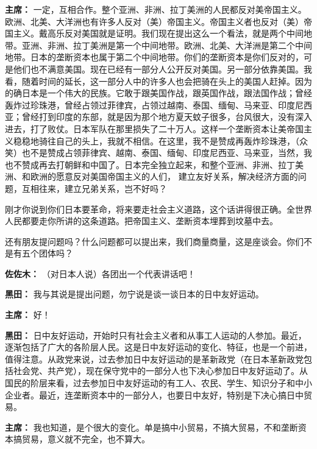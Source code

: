 \begin{list}{}
\item[\textbf{主席：}] 一定，互相合作。整个亚洲、非洲、拉丁美洲的人民都反对美帝国主义。欧洲、北美、大洋洲也有许多人反对（美）帝国主义。帝国主义者也反对（美）帝国主义。戴高乐反对美国就是证明。我们现在提出这么一个看法，就是两个中间地带。亚洲、非洲、拉丁美洲是第一个中间地带。欧洲、北美、大洋洲是第二个中间地带。日本的垄断资本也属于第二个中间地带。你们的垄断资本是你们反对的，可是他们也不满意美国。现在已经有一部分人公开反对美国。另一部分依靠美国。我看，随着时间的延长，这一部分人中的许多人也会把骑在头上的美国人赶掉。因为的确日本是一个伟大的民族。它敢于跟美国作战，跟英国作战，跟法国作战；曾经轰炸过珍珠港，曾经占领过菲律宾，占领过越南、泰国、缅甸、马来亚、印度尼西亚；曾经打到印度的东部，就是因为那个地方夏天蚊子很多，台风很大，没有深入进去，打了败仗。日本军队在那里损失了二十万人。这样一个垄断资本让美帝国主义稳稳地骑往自己的头上，我就不相信。在这里，我不是赞成再轰炸珍珠港，（众笑）也不是赞成占领菲律宾、越南、泰国、缅甸、印度尼西亚、马来亚，当然，我也不赞成再去打朝鲜和中国了。日本完全独立起来，和整个亚洲、非洲、拉丁美洲、和欧洲的愿意反对美国帝国主义的人们， 建立友好关系，解决经济方面的问题，互相往来，建立兄弟关系，岂不好吗？

刚才你说到你们日本要革命，将来要走社会主义道路，这个话讲得很正确。全世界人民都要走你所讲的这条道路。把帝国主义、垄断资本埋葬到坟墓中去。

还有朋友提问题吗？什么问题都可以提出来，我们商量商量，这是座谈会。你们不是有五个团体吗？

\item[\textbf{佐佐木：}] （对日本人说）各团出一个代表讲话吧！

\item[\textbf{黑田：}] 我与其说是提出问题，勿宁说是谈一谈日本的日中友好运动。

\item[\textbf{主席：}] 好！

\item[\textbf{黑田：}] 日中友好运动，开始时只有社会主义者和从事工人运动的人参加。最近，逐渐包括了广大的各阶层人民。这是日中友好运动的变化、特征，也是一个前进，值得注意。从政党来说，过去参加日中友好运动的是革新政党（在日本革新政党包括社会党、共产党），现在保守党中的一部分人也下决心参加日中友好运动了。从国民的阶层来看，过去参加日中友好运动的有工人、农民、学生、知识分子和中小企业者。最近，连垄断资本中的一部分人，也要日中友好，特别是下决心搞日中贸易。

\item[\textbf{主席：}] 我也知道，是个很大的变化。单是搞中小贸易，不搞大贸易，不和垄断资本搞贸易，意义就不完全，也不算大。


\end{list}
